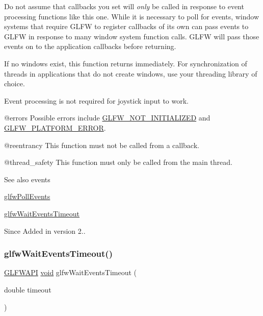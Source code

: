 Do not assume that callbacks you set will {\itshape only} be called in response to event processing functions like this one. While it is necessary to poll for events, window systems that require G\+L\+FW to register callbacks of its own can pass events to G\+L\+FW in response to many window system function calls. G\+L\+FW will pass those events on to the application callbacks before returning.

If no windows exist, this function returns immediately. For synchronization of threads in applications that do not create windows, use your threading library of choice.

Event processing is not required for joystick input to work.

@errors Possible errors include \mbox{\hyperlink{group__errors_ga2374ee02c177f12e1fa76ff3ed15e14a}{G\+L\+F\+W\+\_\+\+N\+O\+T\+\_\+\+I\+N\+I\+T\+I\+A\+L\+I\+Z\+ED}} and \mbox{\hyperlink{group__errors_gad44162d78100ea5e87cdd38426b8c7a1}{G\+L\+F\+W\+\_\+\+P\+L\+A\+T\+F\+O\+R\+M\+\_\+\+E\+R\+R\+OR}}.

@reentrancy This function must not be called from a callback.

@thread\+\_\+safety This function must only be called from the main thread.

\begin{DoxySeeAlso}{See also}
events 

\mbox{\hyperlink{group__window_ga872d16e4c77f58c0436f356255920cfc}{glfw\+Poll\+Events}} 

\mbox{\hyperlink{group__window_ga05223a0a4c5e50f10f289e60398153aa}{glfw\+Wait\+Events\+Timeout}}
\end{DoxySeeAlso}
\begin{DoxySince}{Since}
Added in version 2.. 
\end{DoxySince}
\mbox{\label{group__window_ga05223a0a4c5e50f10f289e60398153aa}} 
\subsubsection{\texorpdfstring{glfwWaitEventsTimeout()}{glfwWaitEventsTimeout()}}
{\footnotesize\ttfamily \mbox{\hyperlink{glfw3_8h_a56da5036b2cc259351ae22fd6439bb47}{G\+L\+F\+W\+A\+PI}} \mbox{\hyperlink{glad_8h_a950fc91edb4504f62f1c577bf4727c29}{void}} glfw\+Wait\+Events\+Timeout (\begin{DoxyParamCaption}\item[{double}]{timeout }\end{DoxyParamCaption})}



